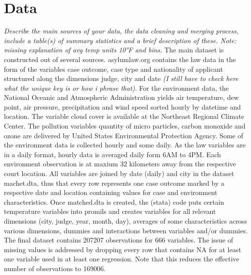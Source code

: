\documentclass[11pt]{article}
\begin{document}
	\section{Data}
	\textit{Describe the main sources of your data, the data cleaning and merging process, include a table(s) of summary statistics and a brief description of these. Note: missing explanation of avg temp units 10°F and bins.}
	\newline
	The main dataset is constructed out of several sources. asylumlaw.org contains the law data in the form of the variables case outcome, case type and nationality of applicant structured along the dimensions judge, city and date \textit{(I still have to check here what the unique key is or how i phrase that)}. For the environment data, the National Oceanic and Atmospheric Administration yields air temperature, dew point, air pressure, precipitation and wind speed sorted hourly by datetime and location. The variable cloud cover is available at the Northeast Regional Climate Center. The pollution variables quantity of micro particles, carbon monoxide and ozone are delivered by United States Environmental Protection Agency. Some of the environment data is collected hourly and some daily. As the law variables are in a daily format, hourly data is averaged daily form 6AM to 4PM. Each environment observation is at maxium 32 kilometers away from the respective court location.
	All variables are joined by date (daily) and city in the dataset machet.dta, thus that every row represents one case outcome marked by a respective date and location containing values for case and environment characteristics. \newline
	Once matched.dta is created, the (stata) code puts certain temperature variables into promils and creates variables for all relevant dimensions (city, judge, year, month, day), averages of some characteristics across various dimensions, dummies and interactions between variables and/or dummies. The final dataset contains 207207 observations for 666 variables. The issue of missing values is addressed by dropping every row that contains NA for at least one variable used in at least one regression. Note that this reduces the effective number of observations to 169006.
	\newline	
\end{document}
